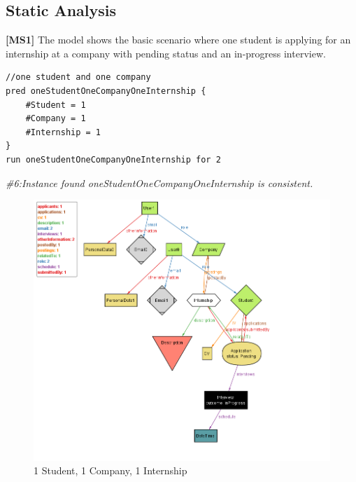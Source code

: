 \subsection{Static Analysis}
\textbf{[MS1]} The model shows the basic scenario where one student is applying for an internship at a company with pending status and an in-progress interview.
\begin{lstlisting}
//one student and one company
pred oneStudentOneCompanyOneInternship {
    #Student = 1
    #Company = 1
    #Internship = 1
}
run oneStudentOneCompanyOneInternship for 2
\end{lstlisting}
\textit{ \#6:Instance found oneStudentOneCompanyOneInternship is consistent.}
\begin{figure}[H]
    \centering
    \includegraphics[width=0.75\linewidth]{RASD//Images/1st1com.png}
    \caption{1 Student, 1 Company, 1 Internship}
    \label{fig:enter-label}
\end{figure}

